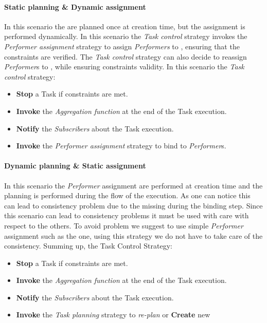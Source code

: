\paragraph{Static \utask{} planning \& Dynamic assignment}
\label{subs:static-dynamic}
In this scenario the \utask{} are planned once at creation time, but the
assignment is performed dynamically. In this scenario the \emph{Task control}
strategy invokes the \emph{Performer assignment} strategy to assign
\emph{Performers} to \utask{}, ensuring that the constraints are verified. The
\emph{Task control} strategy can also decide to reassign \emph{Performer}s to
\utask{}, while ensuring constraints validity. In
this scenario the \emph{Task control} strategy:
\begin{itemize}
	\item \textbf{Stop} a Task if constraints are met.
	\item \textbf{Invoke} the \emph{Aggregation function} at the end of the Task
	execution.
	\item \textbf{Notify} the \emph{Subscribers} about the Task execution.
	\item \textbf{Invoke} the \emph{Performer assignment} strategy to bind \utask{}
	to \emph{Performer}s.
\end{itemize}





\paragraph{Dynamic \utask{} planning \& Static assignment}
\label{subs:dynamic-static}
In this scenario the \emph{Performer} assignment are performed at creation time
and the \utask{} planning is performed during the flow of the execution.
As one can notice this can lead to consistency problem due to the missing
\utask{} during the binding step. Since this scenario can lead to consistency
problems it must be used with care with respect to the others. To avoid problem
we suggest to use simple \emph{Performer} assignment such as the 
one, using this strategy we do not have to take care of the consistency.
Summing up, the Task Control Strategy:
\begin{itemize}
	\item \textbf{Stop} a Task if constraints are met.
	\item \textbf{Invoke} the \emph{Aggregation function} at the end of the Task
	execution.
	\item \textbf{Notify} the \emph{Subscribers} about the Task execution.
	\item \textbf{Invoke} the \emph{Task planning} strategy to \emph{re-plan}
	\utask{} or \textbf{Create} new \utask{}
\end{itemize}




